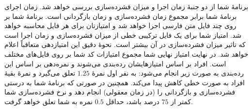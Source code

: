 برنامۀ شما از دو جنبۀ زمان اجرا و میزان فشرده‌سازی بررسی خواهد شد. زمان اجرای برنامۀ شما برابر مجموع زمان فشرده‌سازی و زمان  بازگردانی است. برنامۀ شما بر روی چند فایل متن فارسی اجرا خواهد شد و امتیازتان برای هر فایل محاسبه خواهد شد. امتیاز شما برای یک فایل ترکیبی خطی از میزان فشرده‌سازی و زمان اجرا است که تاثیر میزان فشرده‌سازی در آن بیشتر است. نحوۀ دقیق این امتیازدهی متعاقباً اعلام خواهد شد. در نهایت امتیاز نهایی شما مجموع امتیازات کد شما بر روی فایل‌های مختلف است. افراد بر اساس امتیازهایشان رده‌بندی می‌شوند و نمره‌دهی بر اساس این رده‌بندی به صورت زیر انجام می‌شود: به نفر اول نمرۀ $1.25$ تعلق می‌گیرد و نمرۀ بقیۀ افراد به صورت خطی کاهش پیدا می‌کند. همچنین در صورتی که برنامۀ شما به درستی فشرده‌سازی و بازگردانی را (در زمان معقولی) انجام دهد و نرخ فشرده‌سازی شما کمتر از $75$ درصد باشد، حداقل $0.5$ نمره به شما تعلق خواهد گرفت.

%	
%
%
%		



